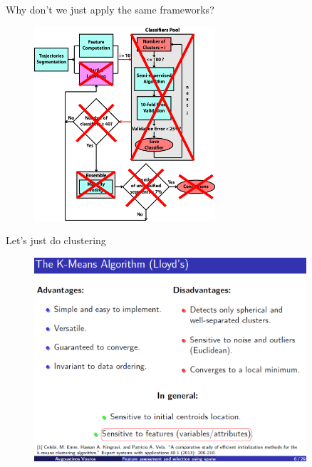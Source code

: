 \documentclass{beamer}
\begin{document}
{\begin{frame}{Why don't we just apply the same frameworks?}
	\begin{figure}[H]
		\centering
		\includegraphics[width=0.6\textwidth]{figures/vourosetal2}
	\end{figure}	
\end{frame}

\begin{frame}{Let's just do clustering}
	\begin{figure}[H]
		\centering
		\includegraphics[width=0.9\textwidth]{figures/prev1}
	\end{figure}	
\end{frame}

}
\end{document}
